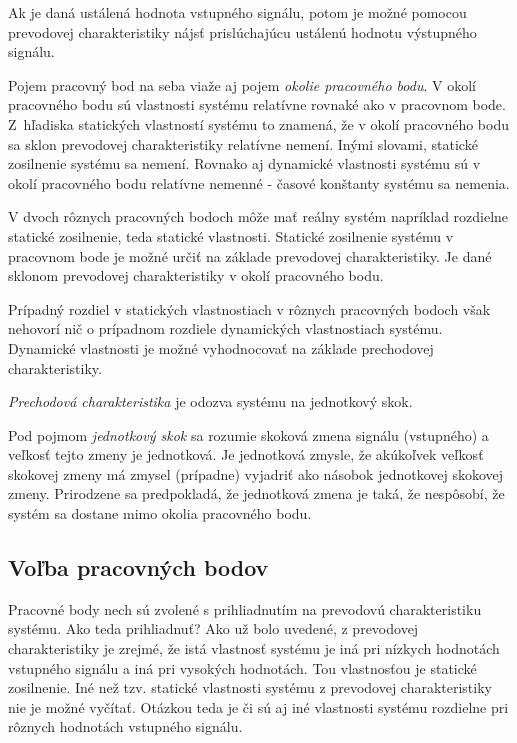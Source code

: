 \documentclass[a4paper, 10pt, ]{article}
\begin{document}
Ak je daná ustálená hodnota vstupného signálu, potom je možné pomocou prevodovej charakteristiky nájsť prislúchajúcu ustálenú hodnotu výstupného signálu.

Pojem pracovný bod na seba viaže aj pojem \emph{okolie pracovného bodu}. V okolí pracovného bodu sú vlastnosti systému relatívne rovnaké ako v pracovnom bode. Z~hľadiska statických vlastností systému to znamená, že v okolí pracovného bodu sa sklon prevodovej charakteristiky relatívne nemení. Inými slovami, statické zosilnenie systému sa nemení. Rovnako aj dynamické vlastnosti systému sú v okolí pracovného bodu relatívne nemenné - časové konštanty systému sa nemenia.

V dvoch rôznych pracovných bodoch môže mať reálny systém napríklad rozdielne statické zosilnenie, teda statické vlastnosti. Statické zosilnenie systému v pracovnom bode je možné určiť na základe prevodovej charakteristiky. Je dané sklonom prevodovej charakteristiky v okolí pracovného bodu.

Prípadný rozdiel v statických vlastnostiach v rôznych pracovných bodoch však nehovorí nič o prípadnom rozdiele dynamických vlastnostiach systému. Dynamické vlastnosti je možné vyhodnocovať na základe prechodovej charakteristiky.

\emph{Prechodová charakteristika} je odozva systému na jednotkový skok.

Pod pojmom \emph{jednotkový skok} sa rozumie skoková zmena signálu (vstupného) a veľkosť tejto zmeny je jednotková. Je jednotková zmysle, že akúkoľvek veľkosť skokovej zmeny má zmysel (prípadne) vyjadriť ako násobok jednotkovej skokovej zmeny. Prirodzene sa predpokladá, že jednotková zmena je taká, že nespôsobí, že systém sa dostane mimo okolia pracovného bodu.






\subsection{Voľba pracovných bodov}

Pracovné body nech sú zvolené s prihliadnutím na prevodovú charakteristiku systému. Ako teda prihliadnuť? Ako už bolo uvedené, z prevodovej charakteristiky je zrejmé, že istá vlastnosť systému je iná pri nízkych hodnotách vstupného signálu a iná pri vysokých hodnotách. Tou vlastnosťou je statické zosilnenie. Iné než tzv. statické vlastnosti systému z prevodovej charakteristiky nie je možné vyčítať. Otázkou teda je či sú aj iné vlastnosti systému rozdielne pri rôznych hodnotách vstupného signálu.
\end{document}
